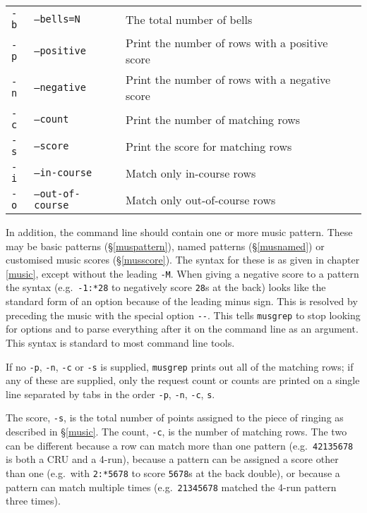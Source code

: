 \documentclass[a4paper,11pt,oneside]{book}
\newcommand{\sref}[1]{\hyperref[#1]{\S\ref{#1}}}
\begin{document}
\begin{tabularx}{\textwidth}{llX}
\texttt{-b}&\texttt{--bells=N}&The total number of bells\\
\texttt{-p}&\texttt{--positive}
   &Print the number of rows with a positive score\\
\texttt{-n}&\texttt{--negative}
  &Print the number of rows with a negative score\\
\texttt{-c}&\texttt{--count}&Print the number of matching rows\\
\texttt{-s}&\texttt{--score}&Print the score for matching rows\\
\texttt{-i}&\texttt{--in-course}&Match only in-course rows\\
\texttt{-o}&\texttt{--out-of-course}&Match only out-of-course rows\\
\end{tabularx}

In addition, the command line should contain one or more music pattern.
These may be basic patterns (\sref{muspattern}), named patterns 
(\sref{musnamed}) or customised music scores (\sref{musscore}). 
The syntax for these is as given in chapter \ref{music},
except without the leading \verb+-M+.  When giving a negative score to 
a pattern the syntax (e.g.\ \verb+-1:*28+ to negatively score \verb+28+s
at the back) looks like the standard form of an option because of the 
leading minus sign.  This is resolved by preceding the music with
the special option \verb+--+.  This tells \texttt{musgrep} to stop looking
for options and to parse everything after it on the command line as an 
argument.  This syntax is standard to most command
line tools.

If no \verb+-p+, \verb+-n+, \verb+-c+ or \verb+-s+ is supplied, 
\texttt{musgrep} prints out all of the matching rows; 
if any of these are supplied, only the request count or counts are printed 
on a single line separated by tabs in the order 
\verb+-p+, \verb+-n+, \verb+-c+, \verb+s+.

The score, \verb+-s+, is the total number of points assigned to the piece
of ringing as described in \sref{music}.  The count, \verb+-c+, is the 
number of matching rows.  The two can be different because a row can match
more than one pattern (e.g.\ \verb+42135678+ is both a CRU and a 4-run), 
because a pattern can be assigned a score other than one 
(e.g.\ with \verb+2:*5678+ to score \verb+5678+s at the back double),
or because a pattern can match multiple times (e.g.\ \verb+21345678+ matched
the 4-run pattern three times).
\end{document}
